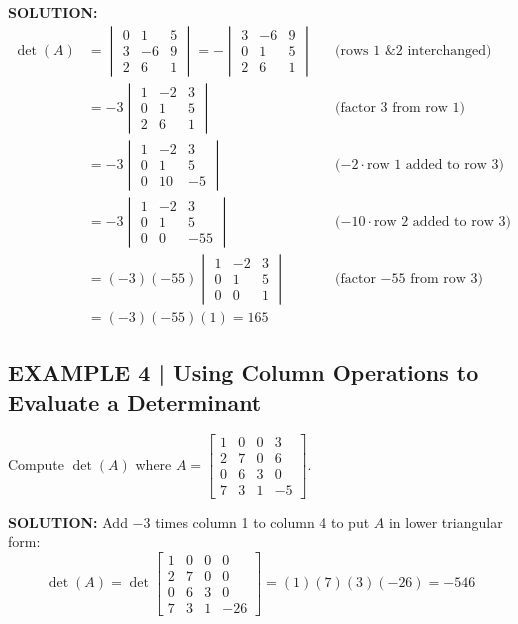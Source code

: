 \documentclass{article}
\theoremstyle{mystyle}
\begin{document}
\textbf{SOLUTION:}
\begin{align*}
\det(A)
&=\begin{vmatrix}0&1&5\\3&-6&9\\2&6&1\end{vmatrix}
=-\begin{vmatrix}3&-6&9\\0&1&5\\2&6&1\end{vmatrix}
&&\text{(rows 1 \& 2 interchanged)}\\
&=-3\begin{vmatrix}1&-2&3\\0&1&5\\2&6&1\end{vmatrix}
&&\text{(factor 3 from row 1)}\\
&=-3\begin{vmatrix}1&-2&3\\0&1&5\\0&10&-5\end{vmatrix}
&&\text{($-2\cdot$row 1 added to row 3)}\\
&=-3\begin{vmatrix}1&-2&3\\0&1&5\\0&0&-55\end{vmatrix}
&&\text{($-10\cdot$row 2 added to row 3)}\\
&=(-3)(-55)\begin{vmatrix}1&-2&3\\0&1&5\\0&0&1\end{vmatrix}
&&\text{(factor $-55$ from row 3)}\\
&=(-3)(-55)(1)=\boxed{165}
\end{align*}

\subsection*{EXAMPLE 4 | Using Column Operations to Evaluate a Determinant}
Compute $\det(A)$ where $A=\begin{bmatrix}1&0&0&3\\2&7&0&6\\0&6&3&0\\7&3&1&-5\end{bmatrix}$.

\textbf{SOLUTION:} Add $-3$ times column 1 to column 4 to put $A$ in lower triangular form:
\[
\det(A)=\det\begin{bmatrix}1&0&0&0\\2&7&0&0\\0&6&3&0\\7&3&1&-26\end{bmatrix}=(1)(7)(3)(-26)=\boxed{-546}
\]
\end{document}
